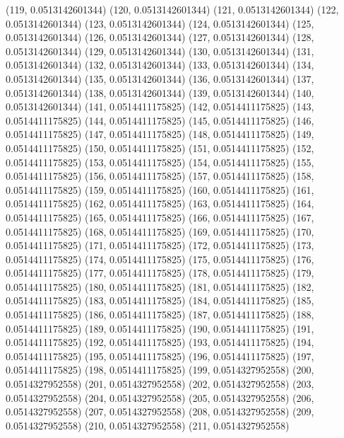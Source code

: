 {					(119, 0.0513142601344)
					(120, 0.0513142601344)
					(121, 0.0513142601344)
					(122, 0.0513142601344)
					(123, 0.0513142601344)
					(124, 0.0513142601344)
					(125, 0.0513142601344)
					(126, 0.0513142601344)
					(127, 0.0513142601344)
					(128, 0.0513142601344)
					(129, 0.0513142601344)
					(130, 0.0513142601344)
					(131, 0.0513142601344)
					(132, 0.0513142601344)
					(133, 0.0513142601344)
					(134, 0.0513142601344)
					(135, 0.0513142601344)
					(136, 0.0513142601344)
					(137, 0.0513142601344)
					(138, 0.0513142601344)
					(139, 0.0513142601344)
					(140, 0.0513142601344)
					(141, 0.0514411175825)
					(142, 0.0514411175825)
					(143, 0.0514411175825)
					(144, 0.0514411175825)
					(145, 0.0514411175825)
					(146, 0.0514411175825)
					(147, 0.0514411175825)
					(148, 0.0514411175825)
					(149, 0.0514411175825)
					(150, 0.0514411175825)
					(151, 0.0514411175825)
					(152, 0.0514411175825)
					(153, 0.0514411175825)
					(154, 0.0514411175825)
					(155, 0.0514411175825)
					(156, 0.0514411175825)
					(157, 0.0514411175825)
					(158, 0.0514411175825)
					(159, 0.0514411175825)
					(160, 0.0514411175825)
					(161, 0.0514411175825)
					(162, 0.0514411175825)
					(163, 0.0514411175825)
					(164, 0.0514411175825)
					(165, 0.0514411175825)
					(166, 0.0514411175825)
					(167, 0.0514411175825)
					(168, 0.0514411175825)
					(169, 0.0514411175825)
					(170, 0.0514411175825)
					(171, 0.0514411175825)
					(172, 0.0514411175825)
					(173, 0.0514411175825)
					(174, 0.0514411175825)
					(175, 0.0514411175825)
					(176, 0.0514411175825)
					(177, 0.0514411175825)
					(178, 0.0514411175825)
					(179, 0.0514411175825)
					(180, 0.0514411175825)
					(181, 0.0514411175825)
					(182, 0.0514411175825)
					(183, 0.0514411175825)
					(184, 0.0514411175825)
					(185, 0.0514411175825)
					(186, 0.0514411175825)
					(187, 0.0514411175825)
					(188, 0.0514411175825)
					(189, 0.0514411175825)
					(190, 0.0514411175825)
					(191, 0.0514411175825)
					(192, 0.0514411175825)
					(193, 0.0514411175825)
					(194, 0.0514411175825)
					(195, 0.0514411175825)
					(196, 0.0514411175825)
					(197, 0.0514411175825)
					(198, 0.0514411175825)
					(199, 0.0514327952558)
					(200, 0.0514327952558)
					(201, 0.0514327952558)
					(202, 0.0514327952558)
					(203, 0.0514327952558)
					(204, 0.0514327952558)
					(205, 0.0514327952558)
					(206, 0.0514327952558)
					(207, 0.0514327952558)
					(208, 0.0514327952558)
					(209, 0.0514327952558)
					(210, 0.0514327952558)
					(211, 0.0514327952558)
}
